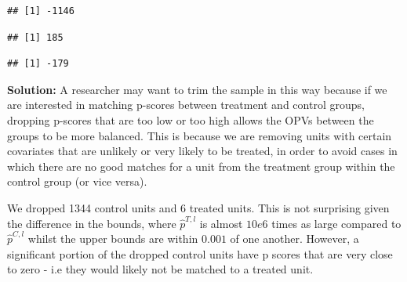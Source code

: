 \documentclass[
]{article}
\newenvironment{Shaded}{\begin{snugshade}}{\end{snugshade}}
\newcommand{\DecValTok}[1]{\textcolor[rgb]{0.00,0.00,0.81}{#1}}
\newcommand{\FunctionTok}[1]{\textcolor[rgb]{0.13,0.29,0.53}{\textbf{#1}}}
\newcommand{\NormalTok}[1]{#1}
\newcommand{\SpecialCharTok}[1]{\textcolor[rgb]{0.81,0.36,0.00}{\textbf{#1}}}
\begin{document}
\begin{verbatim}
## [1] -1146
\end{verbatim}

\begin{Shaded}
\end{Shaded}

\begin{verbatim}
## [1] 185
\end{verbatim}

\begin{Shaded}
\end{Shaded}

\begin{verbatim}
## [1] -179
\end{verbatim}

\textbf{Solution:} A researcher may want to trim the sample in this way
because if we are interested in matching p-scores between treatment and
control groups, dropping p-scores that are too low or too high allows
the OPVs between the groups to be more balanced. This is because we are
removing units with certain covariates that are unlikely or very likely
to be treated, in order to avoid cases in which there are no good
matches for a unit from the treatment group within the control group (or
vice versa).

We dropped 1344 control units and 6 treated units. This is not
surprising given the difference in the bounds, where \(\hat{p}^{T,l}\)
is almost \(10e6\) times as large compared to \(\hat{p}^{C,l}\) whilst
the upper bounds are within \(0.001\) of one another. However, a
significant portion of the dropped control units have p scores that are
very close to zero - i.e they would likely not be matched to a treated
unit.
\end{document}
